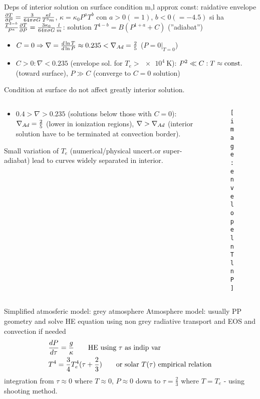\begin{frame}{Deps of interior solution on surface condition}
m,l approx const: raidative envelope $\PDy{P}{T}=\frac{3}{64\pi\sigma G}\frac{\kappa l}{T^3m}$, $\kappa=\kappa_0P^aT^b$ con $a>0(=1)$, $b<0(=-4.5)$ si ha $\frac{T^{3-b}}{P^a}\PDy{P}{T}=\frac{3\kappa_0}{64\pi\sigma G}\frac{l}{m}$: solution $T^{4-b}=B(P^{1+a}+C)$ (''adiabat'')
\begin{itemize}
	\item $C=0\Rightarrow \nabla=\TDly{P}{T}\approx0.235<\nad=\frac{2}{5}$ ($P=0|_{T=0}$)
	\item $C>0: \nabla<0.235$ (envelope sol. for $T_e>\SI{e4}{\kelvin}$): $P^2\ll C: T\approx\const{}$ (toward surface), $P\gg C$ (converge to $C=0$ solution)
	
\end{itemize}
Condition at surface do not affect greatly interior solution.
\begin{columns}[T]
\begin{column}{0.45\textwidth}
\begin{itemize}
	\item $0.4>\nabla>0.235$ (solutions below those with $C=0$): $\nad=\frac{2}{5}$ (lower in ionization regions),
	$\nabla>\nad$ (interior solution have to be terminated at convection border).
\end{itemize}
Small variation of $T_e$ (numerical/physical uncert.or super-adiabat) lead to curves widely separated in interior.
\end{column}
\begin{column}{0.5\textwidth}
\begin{figure}[!ht]
	\texttt{[image: envelopelnTlnP]}\label{fig:envelopelnTlnP}
\end{figure}
\end{column}
\end{columns}

\end{frame}

\begin{frame}{Simplified atmosferic model: grey atmosphere}
Atmosphere model: usually PP geometry and solve HE equation using non grey radiative transport and EOS and convection if needed
\begin{align*}
&\TDy{\tau}{P}=\frac{g}{\kappa}\tag*{HE using $\tau$ as indip var}\\
&T^4=\frac{3}{4}T_e^4(\tau+\frac{2}{3})\tag*{or solar $T(\tau)$ empirical relation}
\end{align*}
integration from $\tau\approx0$ where $T\approx0$, $P\approx0$ down to $\tau=\frac{2}{3}$ where $T=T_e$ - using shooting method.
\end{frame}

